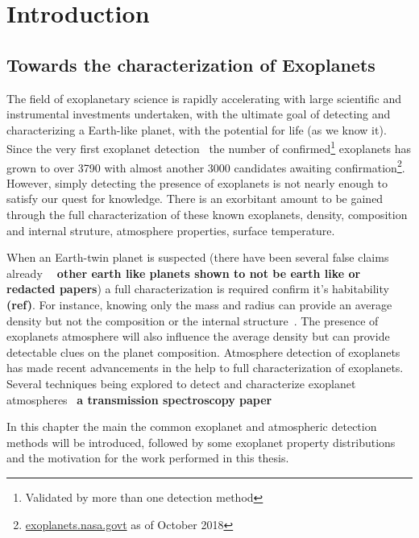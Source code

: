\chapter{Introduction}\label{cha:introduction}


\section{Towards the characterization of Exoplanets}

The field of exoplanetary science is rapidly accelerating with large scientific and instrumental investments undertaken, with the ultimate goal of detecting and characterizing a Earth-like planet, with the potential for life (as we know it).
Since the very first exoplanet detection~\citet{mayor_jupitermass_1995} the number of confirmed\footnote{Validated by more than one detection method} exoplanets has grown to over 3790 with almost another 3000 candidates awaiting confirmation\footnote{\href{https://exoplanets.nasa.gov/}{exoplanets.nasa.govt} as of October 2018}.
However, simply detecting the presence of exoplanets is not nearly enough to satisfy our quest for knowledge.
There is an exorbitant amount to be gained through the full characterization of these known exoplanets, density, composition and internal struture, atmosphere properties, surface temperature.

When an Earth-twin planet is suspected (there have been several false claims already \textbf{~\citep[e.g.][]{mullally_kepler_2018, more} other earth like planets shown to not be earth like or redacted papers}) a full characterization is required confirm it's habitability \textbf{(ref)}.
For instance, knowing only the mass and radius can provide an average density but not the composition or the internal structure~\citet{a paper about composition degeneracy}.
The presence of exoplanets atmosphere will also influence the average density but can provide detectable clues on the planet composition.
Atmosphere detection of exoplanets has made recent advancements in the help to full characterization of exoplanets.
Several techniques being explored to detect and characterize exoplanet atmospheres~\citep[e.g.][]{martins_reflected_2016, piskorz_evidence_2016, snellen_orbital_2010} \textbf{a transmission spectroscopy paper}

In this chapter the main the common exoplanet and atmospheric detection methods will be introduced, followed by some exoplanet property distributions and the motivation for the work performed in this thesis.\\


